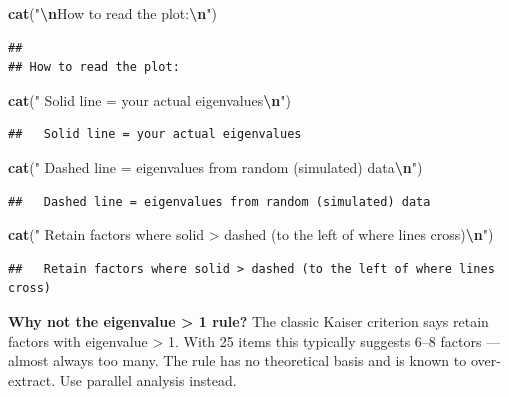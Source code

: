 \documentclass[
]{article}
\newenvironment{Shaded}{\begin{snugshade}}{\end{snugshade}}
\newcommand{\FunctionTok}[1]{\textcolor[rgb]{0.13,0.29,0.53}{\textbf{#1}}}
\newcommand{\NormalTok}[1]{#1}
\newcommand{\SpecialCharTok}[1]{\textcolor[rgb]{0.81,0.36,0.00}{\textbf{#1}}}
\newcommand{\StringTok}[1]{\textcolor[rgb]{0.31,0.60,0.02}{#1}}
\begin{document}
\begin{Shaded}
\begin{Highlighting}[]
\FunctionTok{cat}\NormalTok{(}\StringTok{"}\SpecialCharTok{\textbackslash{}n}\StringTok{How to read the plot:}\SpecialCharTok{\textbackslash{}n}\StringTok{"}\NormalTok{)}
\end{Highlighting}
\end{Shaded}

\begin{verbatim}
## 
## How to read the plot:
\end{verbatim}

\begin{Shaded}
\begin{Highlighting}[]
\FunctionTok{cat}\NormalTok{(}\StringTok{"  Solid line = your actual eigenvalues}\SpecialCharTok{\textbackslash{}n}\StringTok{"}\NormalTok{)}
\end{Highlighting}
\end{Shaded}

\begin{verbatim}
##   Solid line = your actual eigenvalues
\end{verbatim}

\begin{Shaded}
\begin{Highlighting}[]
\FunctionTok{cat}\NormalTok{(}\StringTok{"  Dashed line = eigenvalues from random (simulated) data}\SpecialCharTok{\textbackslash{}n}\StringTok{"}\NormalTok{)}
\end{Highlighting}
\end{Shaded}

\begin{verbatim}
##   Dashed line = eigenvalues from random (simulated) data
\end{verbatim}

\begin{Shaded}
\begin{Highlighting}[]
\FunctionTok{cat}\NormalTok{(}\StringTok{"  Retain factors where solid \textgreater{} dashed (to the left of where lines cross)}\SpecialCharTok{\textbackslash{}n}\StringTok{"}\NormalTok{)}
\end{Highlighting}
\end{Shaded}

\begin{verbatim}
##   Retain factors where solid > dashed (to the left of where lines cross)
\end{verbatim}

\textbf{Why not the eigenvalue \textgreater{} 1 rule?} The classic
Kaiser criterion says retain factors with eigenvalue \textgreater{} 1.
With 25 items this typically suggests 6--8 factors --- almost always too
many. The rule has no theoretical basis and is known to over-extract.
Use parallel analysis instead.
\end{document}
